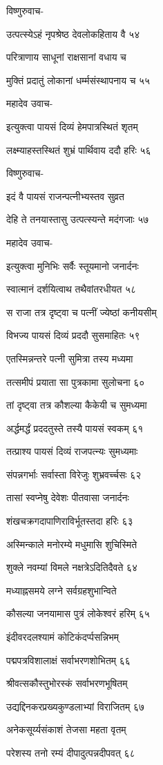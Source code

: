 विष्णुरुवाच-

उत्पत्स्येऽहं नृपश्रेष्ठ देवलोकहिताय वै ५४

परित्राणाय साधूनां राक्षसानां वधाय च

मुक्तिं प्रदातुं लोकानां धर्म्मसंस्थापनाय च ५५

महादेव उवाच-

इत्युक्त्वा पायसं दिव्यं हेमपात्रस्थितं शृतम्

लक्ष्म्याहस्तस्थितं शुभ्रं पार्थिवाय ददौ हरिः ५६

विष्णुरुवाच-

इदं वै पायसं राजन्पत्नीभ्यस्तव सुव्रत

देहि ते तनयास्तासु उत्पत्स्यन्ते मदंगजाः ५७

महादेव उवाच-

इत्युक्त्वा मुनिभिः सर्वैः स्तूयमानो जनार्दनः

स्वात्मानं दर्शयित्वाथ तथैवांतरधीयत ५८

स राजा तत्र दृष्ट्वा च पत्नीं ज्येष्ठां कनीयसीम्

विभज्य पायसं दिव्यं प्रददौ सुसमाहितः ५९

एतस्मिन्नन्तरे पत्नी सुमित्रा तस्य मध्यमा

तत्समीपं प्रयाता सा पुत्रकामा सुलोचना ६०

तां दृष्ट्वा तत्र कौशल्या कैकेयी च सुमध्यमा

अर्द्धमर्द्धं प्रददतुस्ते तस्यै पायसं स्वकम् ६१

तत्प्राश्य पायसं दिव्यं राजपत्न्यः सुमध्यमाः

संपन्नगर्भाः सर्वास्ता विरेजुः शुभ्रवर्च्चसः ६२

तासां स्वप्नेषु देवेशः पीतवासा जनार्दनः

शंखचक्रगदापाणिराविर्भूतस्तदा हरिः ६३

अस्मिन्काले मनोरम्ये मधुमासि शुचिस्मिते

शुक्ले नवम्यां विमले नक्षत्रेऽदितिदैवते ६४

मध्याह्नसमये लग्ने सर्वग्रहशुभान्विते

कौसल्या जनयामास पुत्रं लोकेश्वरं हरिम् ६५

इंदीवरदलश्यामं कोटिकंदर्प्पसन्निभम्

पद्मपत्रविशालाक्षं सर्वाभरणशोभितम् ६६

श्रीवत्सकौस्तुभोरस्कं सर्वाभरणभूषितम्

उद्यद्दिनकरप्रख्यकुण्डलाभ्यां विराजितम् ६७

अनेकसूर्य्यसंकाशं तेजसा महता वृतम्

परेशस्य तनो रम्यं दीपादुत्पन्नदीपवत् ६८

